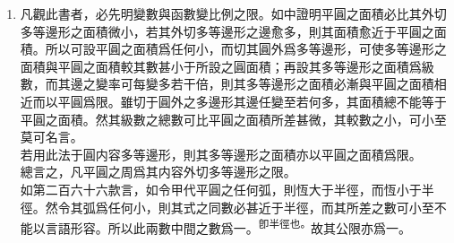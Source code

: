 \begin{enumerate} [label={第\chinese*款},nolistsep]
	\textsuperscript{\textbf{整理者註：}右最後一句云\textit{戌變爲天之陰函數}，這顯而易見是錯誤的。原文卷第九之Fluxions作explicit function，}\\\textsuperscript{卽陽函數，此當爲譯者譯錯。目前由於校勘凡例未定，暫留此字，待討論後決定修改與否。}\\
	昔代數之家，凡遇須用開平方之處，每于其式之左旁作一根字以記之，如\CJKmove 爲天之平方根。後又變通其法，而以根號記之，如\CJKmove 爲天之平方根。此代數之例也。茲可仿照此例，凡遇某變數之函數，亦用一號以記之。所以凡有任何變數之函數，皆可書一函字于其變數之旁，以爲識別。\\
	如天之函數則作\CJKmove ，或作\CJKmove ，皆言天之函數也。\\
	所以凡見變數之左旁有一函字者，其函字並非代表天之倍數，其意謂是某變數之函數也。\\
	用此法則可將\CJKmove 各種之式以一語賅之，謂之\CJKmove 或\CJKmove 。\\
	若函數從兩箇變數而成，其天與地皆爲自主之變數，其式如\CJKmove 者，則可以\CJKmove 別之。函數爲多箇變數所成者，仿此推之。\\
	惟函數只指其變數言之，若甲乙丙丁各常數。雖多不論。
	\item 凡觀此書者，必先明變數與函數變比例之限。如中證明平圓之面積必比其外切多等邊形之面積微小，若其外切多等邊形之邊愈多，則其面積愈近于平圓之面積。所以可設平圓之面積爲任何小，而切其圓外爲多等邊形，可使多等邊形之面積與平圓之面積較其數甚小于所設之圓面積；再設其多等邊形之面積爲級數，而其邊之變率可每變多若干倍，則其多等邊形之面積必漸與平圓之面積相近而以平圓爲限。雖切于圓外之多邊形其邊任變至若何多，其面積總不能等于平圓之面積。然其級數之總數可比平圓之面積所差甚微，其較數之小，可小至莫可名言。\\
	若用此法于圓内容多等邊形，則其多等邊形之面積亦以平圓之面積爲限。\\
	總言之，凡平圓之周爲其内容外切多等邊形之限。\\
	如第二百六十六款言，如令甲代平圓之任何弧，則\CJKmove 恆大于半徑，而\CJKmove 恆小于半徑。然令其弧爲任何小，則其式之同數必甚近于半徑，而其所差之數可小至不能以言語形容。所以此兩數中間之數爲一。\textsuperscript{卽半徑也。}故其公限亦爲一。\\

\end{enumerate}
